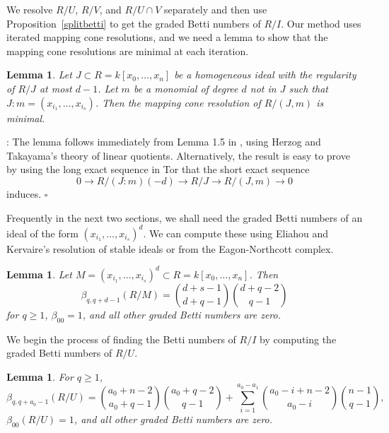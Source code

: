 \documentclass{article}
\begin{document}
We resolve $R/U$, $R/V$, and $R/U \cap V$ separately and then use Proposition~\ref{splitbetti} to get the graded Betti numbers of $R/I$. Our method uses iterated mapping cone resolutions, and we need a lemma to show that the mapping cone resolutions are minimal at each iteration.

\newtheorem{example}[definition]{Example}
\newtheorem{lemma}[definition]{Lemma}
\begin{lemma}
\label{minmap}
Let $J \subset R=k[x_0,\dots,x_n]$ be a homogeneous ideal with the regularity of $R/J$ at most $d-1$. Let $m$ be a monomial of degree $d$ not in $J$ such that $J:m=(x_{i_1},\dots,x_{i_s})$. Then the mapping cone resolution of $R/(J,m)$ is minimal.
\end{lemma}

\newenvironment{proof}{:}{}
\begin{proof}
The lemma follows immediately from Lemma 1.5 in \cite{HerzogTakayama}, using Herzog and Takayama's theory of linear quotients. Alternatively, the result is easy to prove by using the long exact sequence in Tor that the short exact sequence \[ 0 \longrightarrow R/(J:m)(-d) \longrightarrow R/J \longrightarrow R/(J,m) \longrightarrow 0\] induces. \hfill $\square$
\end{proof}

Frequently in the next two sections, we shall need the graded Betti numbers of an ideal of the form $(x_{i_1},\dots,x_{i_s})^d$. We can compute these using Eliahou and Kervaire's resolution of stable ideals \cite{EK} or from the Eagon-Northcott complex.

\begin{lemma}
\label{powerbetti}
Let $M=(x_{i_1},\dots,x_{i_s})^d \subset R=k[x_0,\dots,x_n]$. Then \[ \beta_{q,q+d-1}(R/M) = {d+s-1 \choose d+q-1}{d+q-2 \choose q-1} \] for $q \ge 1$, $\beta_{00}=1$, and all other graded Betti numbers are zero.
\end{lemma}

We begin the process of finding the Betti numbers of $R/I$ by computing the graded Betti numbers of $R/U$.

\begin{lemma}
\label{ubetti} For $q \ge 1$, \[\beta_{q,q+a_0-1}(R/U) = {a_0+n-2 \choose a_0+q-1}{a_0+q-2 \choose q-1} + \sum_{i=1}^{a_0-a_1} {a_0-i+n-2 \choose a_0-i}{n-1 \choose q-1}, \] $\beta_{00}(R/U)=1$, and all other graded Betti numbers are zero.
\end{lemma}
\end{document}
